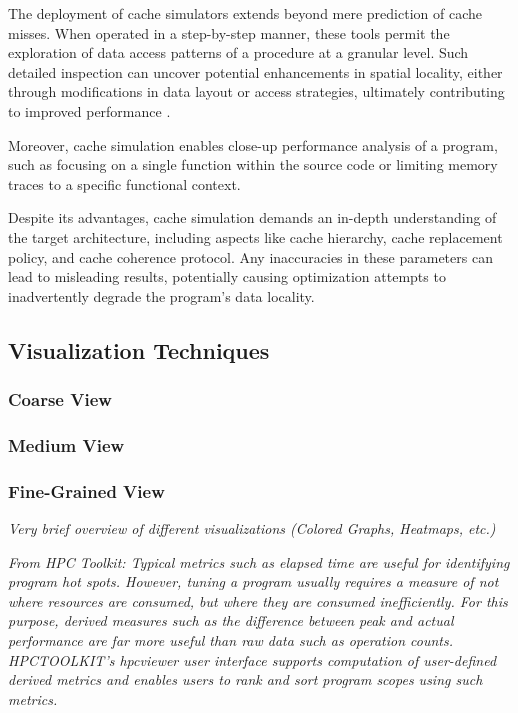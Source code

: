 The deployment of cache simulators extends beyond mere prediction of cache misses. When operated in a step-by-step manner, these tools permit the exploration of data access patterns of a procedure at a granular level. Such detailed inspection can uncover potential enhancements in spatial locality, either through modifications in data layout or access strategies, ultimately contributing to improved performance \cite{schaad2022boosting,hammer2017kerncraft,choudhury2011abstract}.

Moreover, cache simulation enables close-up performance analysis of a program, such as focusing on a single function within the source code or limiting memory traces to a specific functional context.

Despite its advantages, cache simulation demands an in-depth understanding of the target architecture, including aspects like cache hierarchy, cache replacement policy, and cache coherence protocol. Any inaccuracies in these parameters can lead to misleading results, potentially causing optimization attempts to inadvertently degrade the program's data locality.

\subsection{Visualization Techniques}\label{sec:visualization}

\subsubsection{Coarse View}

\subsubsection{Medium View}

\subsubsection{Fine-Grained View}

\textit{Very brief overview of different visualizations (Colored Graphs, Heatmaps, etc.)}

\textit{From HPC Toolkit: Typical metrics such as elapsed time
are useful for identifying program hot spots. However, tuning a program usually requires a measure
of not where resources are consumed, but where they are consumed inefficiently. For this purpose,
derived measures such as the difference between peak and actual performance are far more useful than
raw data such as operation counts. HPCTOOLKIT’s hpcviewer user interface supports computation
of user-defined derived metrics and enables users to rank and sort program scopes using such metrics.}
